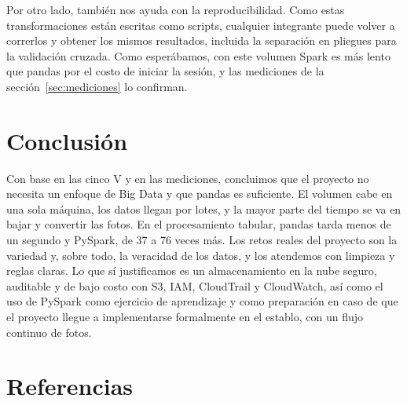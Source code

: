 \documentclass[11pt,letterpaper,DIV=12]{scrartcl}
\begin{document}
Por otro lado, también nos ayuda con la reproducibilidad. Como estas transformaciones están escritas como scripts, cualquier integrante puede volver a correrlos y obtener los mismos resultados, incluida la separación en pliegues para la validación cruzada. Como esperábamos, con este volumen Spark es más lento que pandas por el costo de iniciar la sesión, y las mediciones de la sección~\ref{sec:mediciones} lo confirman.

\section{Conclusión}

Con base en las cinco V y en las mediciones, concluimos que el proyecto no necesita un enfoque de Big Data y que pandas es suficiente. El volumen cabe en una sola máquina, los datos llegan por lotes, y la mayor parte del tiempo se va en bajar y convertir las fotos. En el procesamiento tabular, pandas tarda menos de un segundo y PySpark, de 37 a 76 veces más. Los retos reales del proyecto son la variedad y, sobre todo, la veracidad de los datos, y los atendemos con limpieza y reglas claras. Lo que sí justificamos es un almacenamiento en la nube seguro, auditable y de bajo costo con S3, IAM, CloudTrail y CloudWatch, así como el uso de PySpark como ejercicio de aprendizaje y como preparación en caso de que el proyecto llegue a implementarse formalmente en el establo, con un flujo continuo de fotos.

\section*{Referencias}
\end{document}
